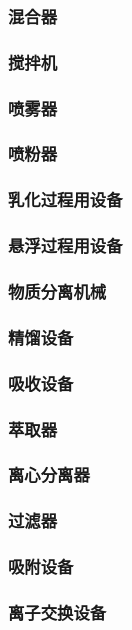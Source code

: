 \documentclass[UTF8]{../../ApplicationUniverse}
\begin{document}
        \subsubsection{混合器}
        \subsubsection{搅拌机}
        \subsubsection{喷雾器}
        \subsubsection{喷粉器}
        \subsubsection{乳化过程用设备}
        \subsubsection{悬浮过程用设备}
    \subsubsection{物质分离机械}
        \subsubsection{精馏设备}
        \subsubsection{吸收设备}
        \subsubsection{萃取器}
        \subsubsection{离心分离器}
        \subsubsection{过滤器}
        \subsubsection{吸附设备}
        \subsubsection{离子交换设备}
\end{document}
